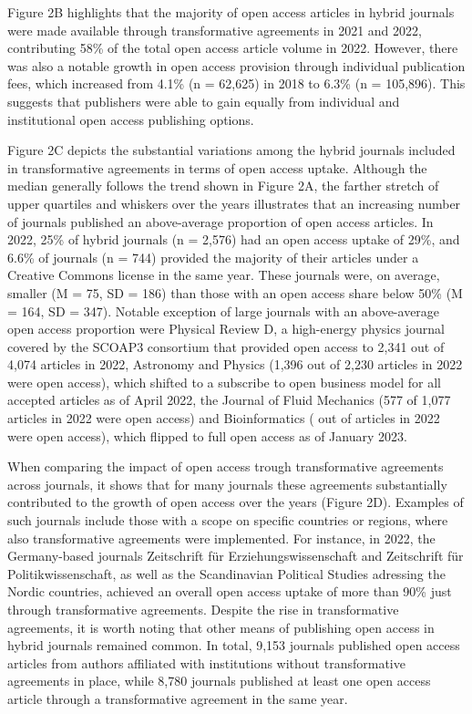 \documentclass[a4paper,man,floatsintext,longtable,noextraspace,12pt]{apa6}
\begin{document}
Figure 2B highlights that the majority of open access articles in hybrid
journals were made available through transformative agreements in 2021
and 2022, contributing 58\% of the total open access article volume in
2022. However, there was also a notable growth in open access provision
through individual publication fees, which increased from 4.1\% (n =
62,625) in 2018 to 6.3\% (n = 105,896). This suggests that publishers
were able to gain equally from individual and institutional open access
publishing options.

Figure 2C depicts the substantial variations among the hybrid journals
included in transformative agreements in terms of open access uptake.
Although the median generally follows the trend shown in Figure 2A, the
farther stretch of upper quartiles and whiskers over the years
illustrates that an increasing number of journals published an
above-average proportion of open access articles. In 2022, 25\% of
hybrid journals (n = 2,576) had an open access uptake of 29\%, and 6.6\%
of journals (n = 744) provided the majority of their articles under a
Creative Commons license in the same year. These journals were, on
average, smaller (M = 75, SD = 186) than those with an open access share
below 50\% (M = 164, SD = 347). Notable exception of large journals with
an above-average open access proportion were Physical Review D, a
high-energy physics journal covered by the SCOAP3 consortium that
provided open access to 2,341 out of 4,074 articles in 2022, Astronomy
and Physics (1,396 out of 2,230 articles in 2022 were open access),
which shifted to a subscribe to open business model for all accepted
articles as of April 2022, the Journal of Fluid Mechanics (577 of 1,077
articles in 2022 were open access) and Bioinformatics ( out of articles
in 2022 were open access), which flipped to full open access as of
January 2023.

When comparing the impact of open access trough transformative
agreements across journals, it shows that for many journals these
agreements substantially contributed to the growth of open access over
the years (Figure 2D). Examples of such journals include those with a
scope on specific countries or regions, where also transformative
agreements were implemented. For instance, in 2022, the Germany-based
journals Zeitschrift für Erziehungswissenschaft and Zeitschrift für
Politikwissenschaft, as well as the Scandinavian Political Studies
adressing the Nordic countries, achieved an overall open access uptake
of more than 90\% just through transformative agreements. Despite the
rise in transformative agreements, it is worth noting that other means
of publishing open access in hybrid journals remained common. In total,
9,153 journals published open access articles from authors affiliated
with institutions without transformative agreements in place, while
8,780 journals published at least one open access article through a
transformative agreement in the same year.
\end{document}
